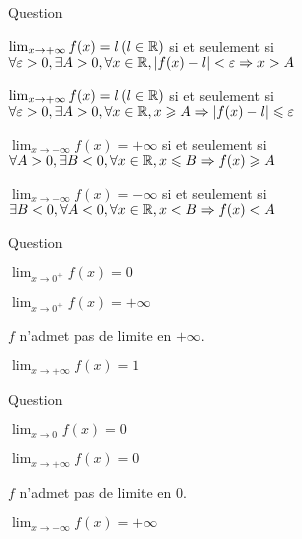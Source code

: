 \begin{multi}[multiple,feedback=
{Voir la définition d'une limite en \(+\infty\) ou \(-\infty\) vers une valeur finie ou infinie :
\(\lim_{x\to +\infty} f(x)=l \, (l\in \Rr)\)  si et seulement si \(\forall \epsilon >0,  \exists A >0, \forall x \in \Rr, x\ge A \Rightarrow |f(x)-l|\le \epsilon\)
\(\lim_{x\to -\infty} f(x)=+\infty\)  si et seulement si \( \forall A >0,  \exists B <0, \forall x \in \Rr, x\le B \Rightarrow f(x)\ge A\)
}]{Question}
    \item \(\lim_{x\to +\infty} f(x)=l \, (l\in \Rr)\)  si et seulement si \( \forall \varepsilon >0,  \exists A >0, \forall x \in \mathbb{R}, |f(x)-l|<\varepsilon \Rightarrow x>A\)
    \item* \(\lim_{x\to +\infty} f(x)=l \, (l\in \Rr)\)  si et seulement si \(\forall \epsilon >0,  \exists A >0, \forall x \in \Rr, x\ge A \Rightarrow |f(x)-l|\le \epsilon\)
    \item* \(\lim_{x\to -\infty} f(x)=+\infty\)  si et seulement si \( \forall A >0,  \exists B <0, \forall x \in \Rr, x\le B \Rightarrow f(x)\ge A\)
    \item \(\lim_{x\to -\infty} f(x)=-\infty\)  si et seulement si \(  \exists B<0, \forall A < 0,   \forall x \in \mathbb{R}, x < B \Rightarrow f(x) < A\)
\end{multi}


\begin{multi}[multiple,feedback=
{\(f(x)= \frac{1}{\sqrt{1+\frac{1}{\sqrt{x}}}}.\)
}]{Question}
    \item* \(\lim_{x\to 0^+} f(x)=0\)
    \item \(\lim_{x\to 0^+} f(x)=+\infty\)
    \item \(f\) n'admet pas de limite en \(+\infty\).
    \item* \(\lim_{x\to +\infty} f(x)=1\)
\end{multi}


\begin{multi}[multiple,feedback=
{En utilisant la définition de la  valeur absolue, \(f(x)=\left\{\begin{array}{cc}x-1,& \mbox{si} \, \, x >0 \\ x+1,& \mbox{si} \,  x <0  \end{array}\right.\).
}]{Question}
    \item \(\lim_{x\to 0} f(x)=0\)
    \item \(\lim_{x\to +\infty} f(x)=0\)
    \item* \(f\) n'admet pas de limite en \(0\).
    \item \(\lim_{x\to -\infty} f(x)=+\infty\)
\end{multi}


